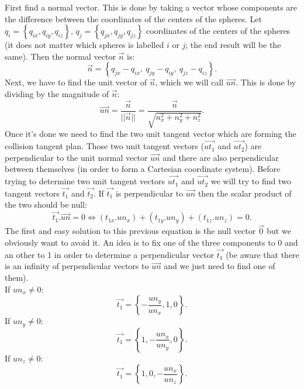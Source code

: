 First find a normal vector.
This is done by taking a vector whose components are the difference between the coordinates of the centers of the spheres. 
Let $q_i = \left\{q_{ix}, q_{iy}, q_{iz}\right\}$, $q_j = \left\{q_{jx}, q_{jy}, q_{jz}\right\}$ coordinates of the centers of the spheres (it does not matter which spheres is labelled $i$ or $j$; the end result will be the same).
Then the normal vector $\vec{n}$ is: 
\begin{equation*}	
	\vec{n} = \left\{ q_{jx} - q_{ix},~q_{jy} - q_{iy},~q_{jz} - q_{iz}  \right\}.
\end{equation*}
Next, we have to find the unit vector of $\vec{n}$, which we will call $\vec{un}$. This is done by dividing by the magnitude of $\vec{n}$:
\begin{equation*}	
	\vec{un} = \frac{\vec{n}}{||\vec{n}||} = \frac{\vec{n}}{\sqrt{n_x^2 + n_y^2 + n_z^2}}.
\end{equation*}
Once it's done we need to find the two unit tangent vector which are forming the collision tangent plan.
Those two unit tangent vectors ($\vec{ut_1}$ and $\vec{ut_2}$) are perpendicular to the unit normal vector $\vec{un}$ and there are also perpendicular between themselves (in order to form a Cartesian coordinate system).
Before trying to determine two unit tangent vectors $\vec{ut_1}$ and $\vec{ut_2}$ we will try to find two tangent vectors $\vec{t_1}$ and $\vec{t_2}$.
If $\vec{t_1}$ is perpendicular to $\vec{un}$ then the scalar product of the two should be null:
\begin{equation*}
	\vec{t_1} . \vec{un} = 0 \Leftrightarrow	(t_{1x} . un_x) + (t_{1y} . un_y) + (t_{1z} . un_z) = 0.
\end{equation*}
The first and easy solution to this previous equation is the null vector $\vec{0}$ but we obviously want to avoid it.
An idea is to fix one of the three components to 0 and an other to 1 in order to determine a perpendicular vector $\vec{t_1}$ (be aware that there is an infinity of perpendicular vectors to $\vec{un}$ and we just need to find one of them).\\
If $un_x \neq 0$:
\begin{equation*}
	\vec{t_1} = \left\{ -\frac{un_y}{un_x}, 1, 0 \right\}.
\end{equation*}
If $un_y \neq 0$:
\begin{equation*}
	\vec{t_1} = \left\{ 1, -\frac{un_x}{un_y}, 0 \right\}.
\end{equation*}
If $un_z \neq 0$:
\begin{equation*}
	\vec{t_1} = \left\{ 1, 0, -\frac{un_x}{un_z} \right\}.
\end{equation*}
